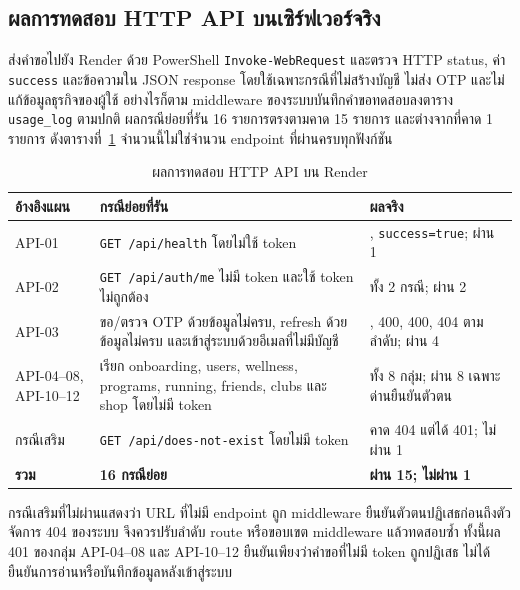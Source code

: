 \subsection{ผลการทดสอบ HTTP API บนเซิร์ฟเวอร์จริง}

ส่งคำขอไปยัง Render ด้วย PowerShell \texttt{Invoke-WebRequest} และตรวจ HTTP status, ค่า \texttt{success} และข้อความใน JSON response โดยใช้เฉพาะกรณีที่ไม่สร้างบัญชี ไม่ส่ง OTP และไม่แก้ข้อมูลธุรกิจของผู้ใช้ อย่างไรก็ตาม middleware ของระบบบันทึกคำขอทดสอบลงตาราง \texttt{usage\_log} ตามปกติ ผลกรณีย่อยที่รัน 16 รายการตรงตามคาด 15 รายการ และต่างจากที่คาด 1 รายการ ดังตารางที่~\ref{tab:backend-http-results} จำนวนนี้ไม่ใช่จำนวน endpoint ที่ผ่านครบทุกฟังก์ชัน

\begin{table}[H]
\centering
\small
\caption{ผลการทดสอบ HTTP API บน Render}
\label{tab:backend-http-results}
\renewcommand{\arraystretch}{1.1}
\begin{tabular}{|>{\raggedright\arraybackslash}p{}|>{\raggedright\arraybackslash}p{}|>{\raggedright\arraybackslash}p{}|}
\hline
\textbf{อ้างอิงแผน} & \textbf{กรณีย่อยที่รัน} & \textbf{ผลจริง} \\ \hline
API-01 & \texttt{GET /api/health} โดยไม่ใช้ token & 200, \texttt{success=true}; ผ่าน 1 \\ \hline
API-02 & \texttt{GET /api/auth/me} ไม่มี token และใช้ token ไม่ถูกต้อง & 401 ทั้ง 2 กรณี; ผ่าน 2 \\ \hline
API-03 & ขอ/ตรวจ OTP ด้วยข้อมูลไม่ครบ, refresh ด้วยข้อมูลไม่ครบ และเข้าสู่ระบบด้วยอีเมลที่ไม่มีบัญชี & 400, 400, 400, 404 ตามลำดับ; ผ่าน 4 \\ \hline
API-04--08, API-10--12 & เรียก onboarding, users, wellness, programs, running, friends, clubs และ shop โดยไม่มี token & 401 ทั้ง 8 กลุ่ม; ผ่าน 8 เฉพาะด่านยืนยันตัวตน \\ \hline
กรณีเสริม & \texttt{GET /api/does-not-exist} โดยไม่มี token & คาด 404 แต่ได้ 401; ไม่ผ่าน 1 \\ \hline
\textbf{รวม} & \textbf{16 กรณีย่อย} & \textbf{ผ่าน 15; ไม่ผ่าน 1} \\ \hline
\end{tabular}
\end{table}

กรณีเสริมที่ไม่ผ่านแสดงว่า URL ที่ไม่มี endpoint ถูก middleware ยืนยันตัวตนปฏิเสธก่อนถึงตัวจัดการ 404 ของระบบ จึงควรปรับลำดับ route หรือขอบเขต middleware แล้วทดสอบซ้ำ ทั้งนี้ผล 401 ของกลุ่ม API-04--08 และ API-10--12 ยืนยันเพียงว่าคำขอที่ไม่มี token ถูกปฏิเสธ ไม่ได้ยืนยันการอ่านหรือบันทึกข้อมูลหลังเข้าสู่ระบบ

